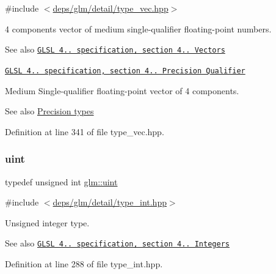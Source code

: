 {\ttfamily \#include $<$\hyperlink{type__vec_8hpp}{deps/glm/detail/type\+\_\+vec.\+hpp}$>$}

4 components vector of medium single-\/qualifier floating-\/point numbers.

\begin{DoxySeeAlso}{See also}
\href{http://www.opengl.org/registry/doc/GLSLangSpec.4.20.8.pdf}{\tt G\+L\+SL 4.. specification, section 4.. Vectors} 

\href{http://www.opengl.org/registry/doc/GLSLangSpec.4.20.8.pdf}{\tt G\+L\+SL 4.. specification, section 4.. Precision Qualifier}
\end{DoxySeeAlso}
Medium Single-\/qualifier floating-\/point vector of 4 components. \begin{DoxySeeAlso}{See also}
\hyperlink{group__core__precision}{Precision types} 
\end{DoxySeeAlso}


Definition at line 341 of file type\+\_\+vec.\+hpp.

\mbox{\label{group__core__precision_ga4fd29415871152bfb5abd588334147c8}} 
\subsubsection{\texorpdfstring{uint}{uint}}
{\footnotesize\ttfamily typedef unsigned int \hyperlink{group__core__precision_ga4fd29415871152bfb5abd588334147c8}{glm\+::uint}}



{\ttfamily \#include $<$\hyperlink{type__int_8hpp}{deps/glm/detail/type\+\_\+int.\+hpp}$>$}

Unsigned integer type.

\begin{DoxySeeAlso}{See also}
\href{http://www.opengl.org/registry/doc/GLSLangSpec.4.20.8.pdf}{\tt G\+L\+SL 4.. specification, section 4.. Integers} 
\end{DoxySeeAlso}


Definition at line 288 of file type\+\_\+int.\+hpp.

